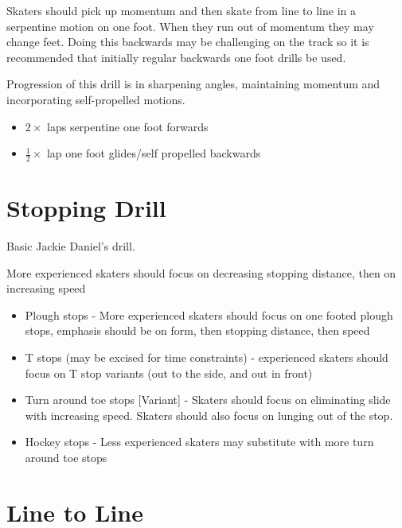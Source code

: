 \documentclass{journal}
\begin{document}
Skaters should pick up momentum and then skate from line to line in a serpentine motion on one foot. When they run out of momentum they may change feet. Doing this backwards may be challenging on the track so it is recommended that initially regular backwards one foot drills be used. 

Progression of this drill is in sharpening angles, maintaining momentum and incorporating self-propelled motions.  
\begin{itemize}
    \item $2\times$ laps serpentine one foot forwards 
    \item $\frac{1}{2}\times$ lap one foot glides/self propelled backwards 
\end{itemize}


\section*{Stopping Drill}
\label{drill:stopping:jackie_daniels}
Basic Jackie Daniel's drill.

More experienced skaters should focus on decreasing stopping distance, then on increasing speed

\begin{itemize}
    \item Plough stops - More experienced skaters should focus on one footed plough stops, emphasis should be on form, then stopping distance, then speed 
    \item T stops (may be excised for time constraints) - experienced skaters should focus on T stop variants (out to the side, and out in front)  
    \item Turn around toe stops [Variant] - Skaters should focus on eliminating slide with increasing speed. Skaters should also focus on lunging out of the stop.  
    \item Hockey stops - Less experienced skaters may substitute with more turn around toe stops 
\end{itemize}


\section*{Line to Line}






\end{document}
